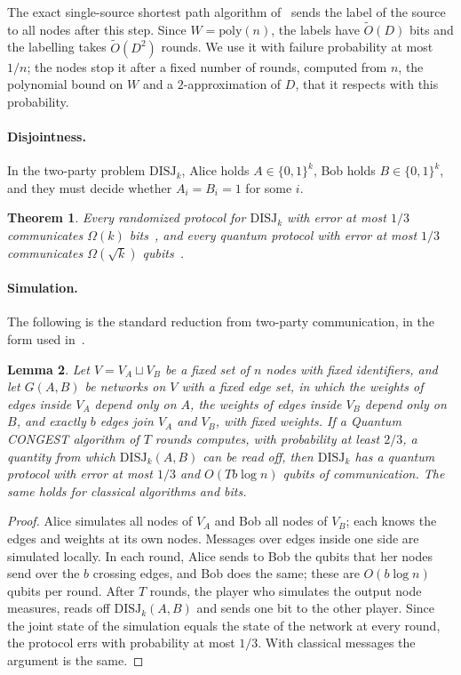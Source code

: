 \documentclass[11pt]{article}
\newtheorem{theorem}{Theorem}[section]
\newtheorem{lemma}[theorem]{Lemma}
\theoremstyle{definition}
\theoremstyle{remark}
\newcommand{\DISJ}{\mathrm{DISJ}}
\newcommand{\Ot}{\tilde O}
\begin{document}
The exact single-source shortest path algorithm of~\cite[Theorem~1.6 and Lemma~5.3]{LP19} sends the label of the source to all nodes after this step. Since $W=\mathrm{poly}(n)$, the labels have $\Ot(D)$ bits and the labelling takes $\Ot(D^2)$ rounds. We use it with failure probability at most $1/n$; the nodes stop it after a fixed number of rounds, computed from $n$, the polynomial bound on $W$ and a $2$-approximation of $D$, that it respects with this probability.

\paragraph{Disjointness.} In the two-party problem $\DISJ_k$, Alice holds $A\in\{0,1\}^k$, Bob holds $B\in\{0,1\}^k$, and they must decide whether $A_i=B_i=1$ for some $i$.

\begin{theorem}\label{thm:disj}
Every randomized protocol for $\DISJ_k$ with error at most $1/3$ communicates $\Omega(k)$ bits~\cite{KS92,Raz92}, and every quantum protocol with error at most $1/3$ communicates $\Omega(\sqrt k)$ qubits~\cite{Raz03}.
\end{theorem}

\paragraph{Simulation.} The following is the standard reduction from two-party communication, in the form used in~\cite[Theorem~10]{LM18}.

\begin{lemma}\label{lem:sim}
Let $V = V_A\sqcup V_B$ be a fixed set of $n$ nodes with fixed identifiers, and let $G(A,B)$ be networks on $V$ with a fixed edge set, in which the weights of edges inside $V_A$ depend only on $A$, the weights of edges inside $V_B$ depend only on $B$, and exactly $b$ edges join $V_A$ and $V_B$, with fixed weights. If a Quantum CONGEST algorithm of $T$ rounds computes, with probability at least $2/3$, a quantity from which $\DISJ_k(A,B)$ can be read off, then $\DISJ_k$ has a quantum protocol with error at most $1/3$ and $O(Tb\log n)$ qubits of communication. The same holds for classical algorithms and bits.
\end{lemma}

\begin{proof}
Alice simulates all nodes of $V_A$ and Bob all nodes of $V_B$; each knows the edges and weights at its own nodes. Messages over edges inside one side are simulated locally. In each round, Alice sends to Bob the qubits that her nodes send over the $b$ crossing edges, and Bob does the same; these are $O(b\log n)$ qubits per round. After $T$ rounds, the player who simulates the output node measures, reads off $\DISJ_k(A,B)$ and sends one bit to the other player. Since the joint state of the simulation equals the state of the network at every round, the protocol errs with probability at most $1/3$. With classical messages the argument is the same.
\end{proof}
\end{document}
